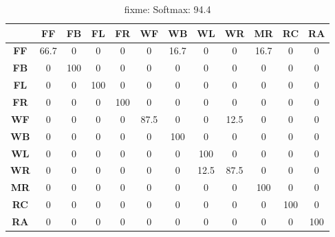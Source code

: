 \documentclass{IEEEtran}
\begin{document}
\begin{table}
\caption{fixme: Softmax: 94.4}
\resizebox{\columnwidth}{!}
{
\begin{tabular}{|c|c|c|c|c|c|c|c|c|c|c|c|}
\hline 
& \textbf{FF} & \textbf{FB}  & \textbf{FL} & \textbf{FR} &  \textbf{WF} & 
\textbf{WB} & \textbf{WL} & \textbf{WR} & \textbf{MR} & 
\textbf{RC} & \textbf{RA} \\ \hline
\textbf{FF} & 66.7 &  0 &  0 &  0 &  0 &  16.7 &  0 &  0 &  16.7 &  0 &  0 \\ \hline
\textbf{FB} & 0 &  100 &  0 &  0 &  0 &  0 &  0 &  0 &  0 &  0 &  0 \\ \hline
\textbf{FL} & 0 &  0 &  100 &  0 &  0 &  0 &  0 &  0 &  0 &  0 &  0 \\ \hline
\textbf{FR} & 0 &  0 &  0 &  100 &  0 &  0 &  0 &  0 &  0 &  0 &  0 \\ \hline
\textbf{WF} & 0 &  0 &  0 &  0 &  87.5 &  0 &  0 &  12.5 &  0 &  0 &  0 \\ \hline
\textbf{WB} & 0 &  0 &  0 &  0 &  0 &  100 &  0 &  0 &  0 &  0 &  0 \\ \hline
\textbf{WL} & 0 &  0 &  0 &  0 &  0 &  0 &  100 &  0 &  0 &  0 &  0 \\ \hline
\textbf{WR} & 0 &  0 &  0 &  0 &  0 &  0 &  12.5 &  87.5 &  0 &  0 &  0 \\ \hline
\textbf{MR} & 0 &  0 &  0 &  0 &  0 &  0 &  0 &  0 &  100 &  0 &  0 \\ \hline
\textbf{RC} & 0 &  0 &  0 &  0 &  0 &  0 &  0 &  0 &  0 &  100 &  0 \\ \hline
\textbf{RA} & 0 &  0 &  0 &  0 &  0 &  0 &  0 &  0 &  0 &  0 &  100 \\ \hline
\end{tabular}
}
\end{table}
\end{document}
